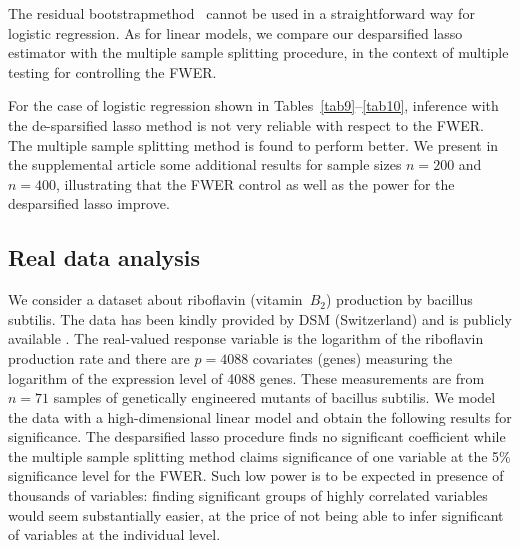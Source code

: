 \documentclass[aos,MSNbibl,dvips]{arximspdf}
\begin{document}
The residual bootstrap\break  method~\cite{chatter13}
cannot be used in a straightforward way for logistic regression. As for
linear models, we compare our desparsified lasso estimator with the
multiple sample
splitting procedure, in the context of multiple testing for controlling the
FWER.


For the case of logistic regression shown in Tables~\ref{tab9}--\ref{tab10},
inference with the de-sparsified lasso method is not very reliable with
respect to the FWER. The multiple sample splitting method is found to
perform better. We present in the supplemental article \cite
{supplement} some additional
results for sample sizes $n=200$ and $n=400$, illustrating that the FWER
control as well as the power for the desparsified lasso
improve.\vspace*{-2pt}

\subsection{Real data analysis}

We consider a dataset about
riboflavin (vitamin~$B_{2}$) production\vadjust{\goodbreak} by bacillus subtilis. The data
has been
kindly provided by DSM (Switzerland) and is publicly available \cite
{bumeka13}.
The real-valued response variable is the logarithm of the riboflavin
production rate and there are $p=4088$
covariates (genes) measuring the logarithm of the expression level of 4088
genes. These measurements are from $n=71$ samples of genetically
engineered mutants of bacillus subtilis. We model the data with a
high-dimensional linear model and obtain the following results for
significance. The desparsified lasso procedure finds no significant
coefficient while the multiple sample splitting method claims
significance of one variable at the 5\% significance level for the
FWER. Such low power is to be expected in presence of thousands of
variables: finding significant groups of highly correlated variables would
seem substantially easier, at the price of not being able to infer
significant of variables at the individual level.
\end{document}
